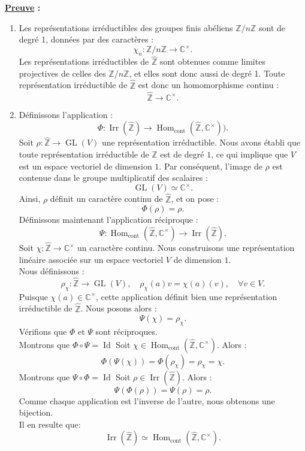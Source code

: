 \documentclass[a4paper, 14pt]{report}
\begin{document}
\begin{onehalfspace}
{\textbf{\underline{Preuve} :}
\begin{enumerate} [label=\roman*)] 
 \item Les représentations irréductibles des groupes finis abéliens $\mathbb{Z}/n\mathbb{Z}$ sont de degré 1, données par des caractères :
 \[
 \chi_n : \mathbb{Z}/n\mathbb{Z} \to \mathbb{C}^\times .
 \]
 Les représentations irréductibles de $\widehat{\mathbb{Z}}$ sont obtenues comme limites projectives de celles des $\mathbb{Z}/n\mathbb{Z}$, et elles sont donc aussi de degré 1. Toute représentation irréductible de $\widehat{\mathbb{Z}}$ est donc un homomorphisme continu :
 \[
 \widehat{\mathbb{Z}} \to \mathbb{C}^\times.
 \]
 \item Définissons l'application :
 \[
 \Phi : \operatorname{Irr}(\widehat{\mathbb{Z}}) \to \operatorname{Hom}_{\text{cont}}(\widehat{\mathbb{Z}}, \mathbb{C}^\times)).
 \]
 Soit $\rho : \widehat{\mathbb{Z}} \to \operatorname{GL}(V)$ une représentation irréductible. Nous avons établi que toute représentation irréductible de $\widehat{\mathbb{Z}}$ est de degré $1$, ce qui implique que $V$ est un espace vectoriel de dimension $1$. Par conséquent, l'image de $\rho$ est contenue dans le groupe multiplicatif des scalaires :
 \[
 \operatorname{GL}(V) \simeq \mathbb{C}^\times.
 \]
 Ainsi, $\rho$ définit un caractère continu de $\widehat{\mathbb{Z}}$, et on pose :
 \[
 \Phi(\rho) = \rho.
 \]
 Définissons maintenant l'application réciproque :
 \[
 \Psi : \operatorname{Hom}_{\text{cont}}(\widehat{\mathbb{Z}}, \mathbb{C}^\times) \to \operatorname{Irr}(\widehat{\mathbb{Z}}).
 \]
 Soit $\chi : \widehat{\mathbb{Z}} \to \mathbb{C}^\times$ un caractère continu. Nous construisons une représentation linéaire associée sur un espace vectoriel $V$ de dimension $1$. \\ 
 Nous définissons :
 \[
 \rho_\chi : \widehat{\mathbb{Z}} \to \operatorname{GL}(V), \quad \rho_\chi(a) v = \chi(a)(v), \quad \forall v \in V.
 \]
 Puisque $\chi(a) \in \mathbb{C}^\times$, cette application définit bien une représentation irréductible de $\widehat{\mathbb{Z}}$. Nous posons alors :
 \[
 \Psi(\chi) = \rho_\chi.
 \]
 Vérifions que $\Phi$ et $\Psi$ sont réciproques.\\	
 Montrons que $\Phi \circ \Psi = \operatorname{Id}$  
 Soit $\chi \in \operatorname{Hom}_{\text{cont}}(\widehat{\mathbb{Z}}, \mathbb{C}^\times)$. Alors :
 \[
 \Phi(\Psi(\chi)) = \Phi(\rho_\chi) = \rho_\chi = \chi.
 \]
 Montrons que $\Psi \circ \Phi = \operatorname{Id}$ 
 Soit $\rho \in \operatorname{Irr}(\widehat{\mathbb{Z}})$. Alors :
 \[
 \Psi(\Phi(\rho)) = \Psi(\rho) = \rho.
 \]
 Comme chaque application est l'inverse de l'autre, nous obtenons une bijection.\\	
 Il en resulte que:
 \[ 
 \operatorname{Irr}(\widehat{\mathbb{Z}}) \simeq \operatorname{Hom}_{\text{cont}}(\widehat{\mathbb{Z}}, \mathbb{C}^\times).
 \]
 

\end{enumerate}}
\end{onehalfspace}
\end{document}
